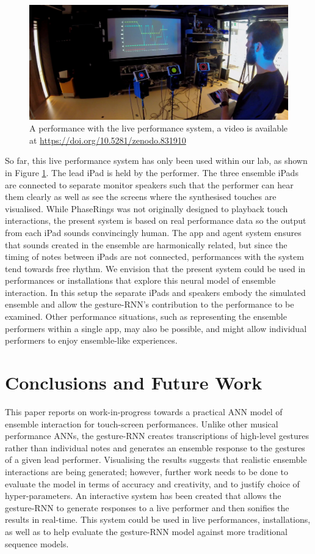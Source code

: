 \documentclass[sigchi, authorversion=true]{acmart}
\begin{document}
\begin{figure}
  \centering
  \includegraphics[width=\columnwidth]{neural-ipad-band-demo.jpg}
  \caption{A performance with the live performance system, a video is
    available at
    \url{https://doi.org/10.5281/zenodo.831910}}\label{fig:live-system-demo}
\end{figure}

So far, this live performance system has only been used within our lab,
as shown in Figure \ref{fig:live-system-demo}. The lead iPad is held
by the performer. The three ensemble iPads are connected to separate
monitor speakers such that the performer can hear them clearly as well
as see the screens where the synthesised touches are visualised. While
PhaseRings was not originally designed to playback touch interactions,
the present system is based on real performance data so the output
from each iPad sounds convincingly human. The app and agent system
ensures that sounds created in the ensemble are harmonically related,
but since the timing of notes between iPads are not connected,
performances with the system tend towards free rhythm. We envision
that the present system could be used in performances or installations
that explore this neural model of ensemble interaction. In this setup
the separate iPads and speakers embody the simulated ensemble and
allow the gesture-RNN's contribution to the performance to be
examined. Other performance situations, such as representing the
ensemble performers within a single app, may also be possible, and
might allow individual performers to enjoy ensemble-like experiences.

\section{Conclusions and Future Work}

This paper reports on work-in-progress towards a practical ANN model
of ensemble interaction for touch-screen performances. Unlike other
musical performance ANNs, the gesture-RNN creates transcriptions of
high-level gestures rather than individual notes and generates an
ensemble response to the gestures of a given lead performer.
Visualising the results suggests that realistic ensemble interactions
are being generated; however, further work needs to be done to
evaluate the model in terms of accuracy and creativity, and to justify
choice of hyper-parameters. An interactive system has been created
that allows the gesture-RNN to generate responses to a live performer
and then sonifies the results in real-time. This system could be used
in live performances, installations, as well as to help evaluate the
gesture-RNN model against more traditional sequence models.
\end{document}
